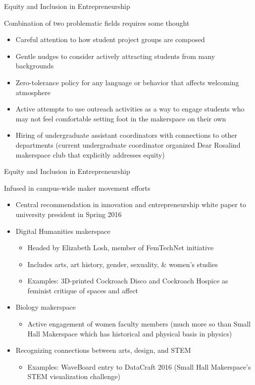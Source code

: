 \documentclass[xcolor=table,compress,professionalfonts,pdfpagelabels]{beamer}
\begin{document}
\begin{frame}{Equity and Inclusion in Entrepreneurship}
 \begin{block}{Combination of two problematic fields requires some thought}
  \begin{itemize}
   \item Careful attention to how student project groups are composed
   \item Gentle nudges to consider actively attracting students from many backgrounds
   \item Zero-tolerance policy for any language or behavior that affects welcoming atmosphere
   \item Active attempts to use outreach activities as a way to engage students who may not feel comfortable setting foot in the makerspace on their own
   \item Hiring of undergraduate assistant coordinators with connections to other departments (current undergraduate coordinator organized Dear Rosalind makerspace club that explicitly addresses equity)
  \end{itemize}
 \end{block}
\end{frame}

\begin{frame}{Equity and Inclusion in Entrepreneurship}
 \begin{block}{Infused in campus-wide maker movement efforts}
  \begin{itemize}
   \item Central recommendation in innovation and entrepreneurship white paper to university president in Spring 2016
   \item Digital Humanities makerspace
    \begin{itemize}
     \item Headed by Elizabeth Losh, member of FemTechNet initiative
     \item Includes arts, art history, gender, sexuality, \& women's studies
     \item Examples: 3D-printed Cockroach Disco and Cockroach Hospice as feminist critique of spaces and affect
    \end{itemize}
   \item Biology makerspace
    \begin{itemize}
     \item Active engagement of women faculty members (much more so than Small Hall Makerspace which has historical and physical basis in physics)
    \end{itemize}
   \item Recognizing connections between arts, design, and STEM
    \begin{itemize}
     \item Examples: WaveBoard entry to DataCraft 2016 (Small Hall Makerspace's STEM visualization challenge)
    \end{itemize}
  \end{itemize}
 \end{block}
\end{frame}
\end{document}
